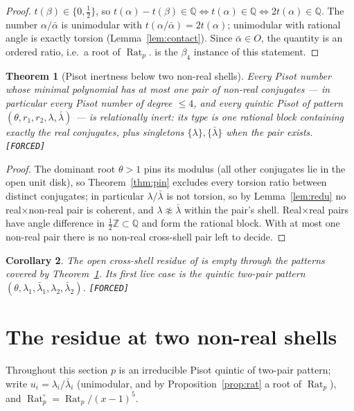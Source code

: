 \documentclass[11pt]{article}
\newcommand{\F}{\textnormal{\texttt{[FORCED]}}}
\newcommand{\Q}{\mathbb{Q}}
\newcommand{\Z}{\mathbb{Z}}
\newcommand{\Rat}{\operatorname{Rat}}
\newtheorem{theorem}{Theorem}[section]
\newtheorem{corollary}[theorem]{Corollary}
\theoremstyle{definition}
\begin{document}
\begin{proof}
$t(\beta)\in\{0,\tfrac12\}$, so $t(\alpha)-t(\beta)\in\Q\iff t(\alpha)\in\Q
\iff 2t(\alpha)\in\Q$. The number $\alpha/\bar\alpha$ is unimodular with
$t(\alpha/\bar\alpha)=2t(\alpha)$; unimodular with rational angle is exactly
torsion (Lemma~\ref{lem:contact}). Since $\bar\alpha\in O$, the quantity is an
ordered ratio, i.e.\ a root of $\Rat_p$. \cite[Ex.~7.17(iii)]{relcharge} is the
$\beta_4$ instance of this statement.
\end{proof}

\begin{theorem}[Pisot inertness below two non-real shells]\label{thm:pisot1pair}
Every Pisot number whose minimal polynomial has at most one pair of non-real
conjugates --- in particular every Pisot number of degree $\le 4$, and every
quintic Pisot of pattern $(\theta,r_1,r_2,\lambda,\bar\lambda)$ --- is
relationally inert: its type is one rational block containing exactly the real
conjugates, plus singletons $\{\lambda\},\{\bar\lambda\}$ when the pair exists. \F
\end{theorem}

\begin{proof}
The dominant root $\theta>1$ pins its modulus (all other conjugates lie in the
open unit disk), so Theorem~\ref{thm:pin} excludes every torsion ratio between
distinct conjugates; in particular $\lambda/\bar\lambda$ is not torsion, so by
Lemma~\ref{lem:redu} no real$\times$non-real pair is coherent, and
$\lambda\not\approx\bar\lambda$ within the pair's shell. Real$\times$real pairs
have angle difference in $\tfrac12\Z\subset\Q$ and form the rational block.
With at most one non-real pair there is no non-real cross-shell pair left to
decide.
\end{proof}

\begin{corollary}\label{cor:residue-location}
The open cross-shell residue of \cite[Cor.~7.16]{relcharge} is empty through
the patterns covered by Theorem~\ref{thm:pisot1pair}. Its first live case is
the quintic two-pair pattern $(\theta,\lambda_1,\bar\lambda_1,\lambda_2,\bar\lambda_2)$. \F
\end{corollary}

\section{The residue at two non-real shells}\label{sec:residue}

Throughout this section $p$ is an irreducible Pisot quintic of two-pair pattern;
write $u_i=\lambda_i/\bar\lambda_i$ (unimodular, and by
Proposition~\ref{prop:rat} a root of $\Rat_p$), and
$\Rat_p^{\circ}=\Rat_p/(x-1)^5$.
\end{document}
